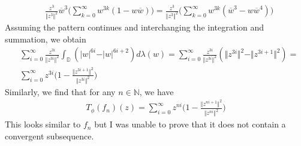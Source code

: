 \documentclass[12pt]{article}
\begin{document}
\begin{align*}
&\frac{z^3}{\Vert z^3 \Vert^2} \overline{w}^3 \Bigg(\sum_{k=0}^\infty w^{3k}(1 - w\overline{w})\Bigg) = \frac{z^3}{\Vert z^3 \Vert^2}\Bigg(\sum_{k=0}^\infty w^{3k}(\overline{w}^3 - w\overline{w}^4)\Bigg)
\end{align*} Assuming the pattern continues and interchanging the integration and summation, we obtain
\begin{align*}
& \sum_{i=0}^\infty \frac{z^{3i}}{\Vert z^{3i}\Vert^2} \int_\mathbb{D} (\vert w \vert^{6i} - \vert w \vert^{6i+2}) d\lambda(w)  = \sum_{i=0}^\infty \frac{z^{3i}}{\Vert z^{3i} \Vert^2}(\Vert z^{3i} \Vert^2 - \Vert z^{3i+1}\Vert^2) = \\
& \sum_{i=0}^\infty z^{3i}\bigg(1 - \frac{\Vert z^{3i+1}\Vert^2}{\Vert z^{3i}\Vert^2}\bigg)
\end{align*} Similarly, we find that for any $n \in \mathbb{N}$, we have
\begin{align*}
T_\phi(f_n)(z) = \sum_{i=0}^\infty z^{ni} \bigg(1 - \frac{\Vert z^{ni+1}\Vert^2}{\Vert z^{ni}\Vert^2}\bigg) 
\end{align*} This looks similar to $f_n$ but I was unable to prove that it does not contain a convergent subsequence.
\end{document}
